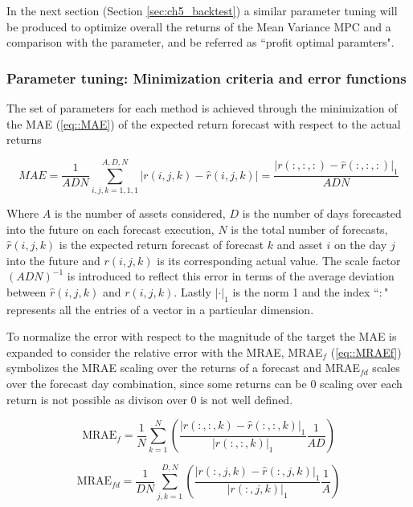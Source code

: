 In the next section (Section \ref{sec:ch5_backtest}) a similar parameter tuning will be produced to optimize overall the returns of the Mean Variance MPC and a comparison with the parameter, and be referred as ``profit optimal paramters".  

\subsubsection{Parameter tuning: Minimization criteria and error functions}

The set of parameters for each method is achieved through the minimization of the \ac{MAE} (\ref{eq::MAE}) of the expected return forecast with respect to the actual returns

\begin{equation}\label{eq::MAE}
    MAE = \frac{1}{A D N} \sum_{i,j,k=1,1,1}^{A,D,N} |r(i,j,k) - \hat{r}(i,j,k)| = \frac{|r(:,:,:) - \hat{r}(:,:,:)|_1}{A D N} 
\end{equation}

Where $A$ is the number of assets considered, $D$ is the number of days forecasted into the future on each forecast execution, $N$ is the total number of forecasts, $\hat{r}(i,j,k)$ is the expected return forecast of forecast $k$ and asset $i$ on the day $j$ into the future and $r(i,j,k)$ is its corresponding actual value. The scale factor $(ADN)^{-1}$ is introduced to reflect this error in terms of the average deviation between $\hat{r}(i,j,k)$ and $r(i,j,k)$. Lastly $|\cdot|_1$ is the norm 1 and the index ``$:$" represents all the entries of a vector in a particular dimension.

To normalize the error with respect to the magnitude of the target the \ac{MAE} is expanded to consider the relative error with the \ac{MRAE}, \ac{MRAE}$_f$ (\ref{eq::MRAEf}) symbolizes the \ac{MRAE} scaling over the returns of a forecast and \ac{MRAE}$_{fd}$ scales over the forecast day combination, since some returns can be 0 scaling over each return is not possible as divison over 0 is not well defined.


\begin{equation}\label{eq::MRAEf}
    \text{MRAE}_f = \frac{1}{N}\sum_{k=1}^N \left( \frac{|r(:,:,k) - \hat{r} (:,:,k)|_1}{|r(:,:,k)|_1 } \frac{1}{A D} \right) 
\end{equation}

\begin{equation}\label{eq::MRAEfd}
    \text{MRAE}_{fd} = \frac{1}{D N}\sum_{j,k=1}^{D,N} \left( \frac{|r(:,j,k) - \hat{r} (:,j,k)|_1}{|r(:,j,k)|_1 } \frac{1}{A} \right) 
\end{equation}


